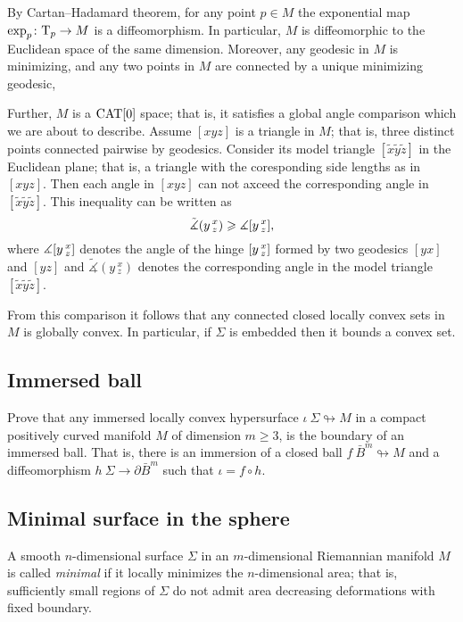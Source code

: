 By Cartan--Hadamard theorem, for any point $p\in M$
the exponential map $\exp_p\colon\mathrm{T}_p\to M$ is a diffeomorphism.
In particular, $M$ is diffeomorphic to the Euclidean space of the same dimension.
Moreover, any geodesic in $M$ is minimizing,
and any two points in $M$ are connected by a unique minimizing geodesic,

Further, $M$ is a $\operatorname{\rm CAT}\nolimits[0]$ space; that is, it satisfies a global angle comparison which we are about to describe.
Assume $[xyz]$ is a triangle in $M$;
that is, three distinct points connected pairwise by geodesics.
Consider its model triangle $[\tilde x\tilde y\tilde z]$ in the Euclidean plane;
that is, a triangle with the coresponding side lengths as in $[xyz]$.
Then each angle in $[xyz]$ can not axceed the corresponding angle in $[\tilde x\tilde y\tilde z]$.
This inequality can be written as
\[\tilde\measuredangle(y\,^x_z)\geqslant\measuredangle[y\,{}^{x}_{z}],\]
where $\measuredangle[y\,{}^{x}_{z}]$ denotes the angle of the hinge $[y\,{}^{x}_{z}]$ formed by two geodesics $[yx]$ and $[yz]$ 
and $\tilde\measuredangle(y\,^x_z)$ denotes the corresponding angle in the model triangle $[\tilde x\tilde y\tilde z]$.

From this comparison it follows that any connected closed locally convex sets in $M$ is globally convex.
In particular, if $\Sigma$ is embedded then it bounds a convex set.


\subsection*{Immersed ball\hard}
\label{Immersed ball}

\begin{pr}
Prove that any immersed locally convex
hypersurface $\iota\:\Sigma\looparrowright M$
in a compact positively curved manifold $M$ of dimension $m\ge 3$, is the boundary of an immersed ball. 
That is, there is an immersion of a closed ball $f\:\bar B^m\looparrowright M$ and a diffeomorphism $h\:\Sigma\to\partial \bar B^m$
such that $\iota=f\circ h$.
\end{pr}

\subsection*{Minimal surface in the sphere}
\label{minimal surface}\label{almgren} 

A  smooth $n$-dimensional surface $\Sigma$ in
an $m$-dimensional Riemannian manifold $M$ is called \emph{minimal}
if it locally minimizes the $n$-dimensional area;
that is, sufficiently small regions of $\Sigma$ do not admit area decreasing deformations with fixed boundary.

